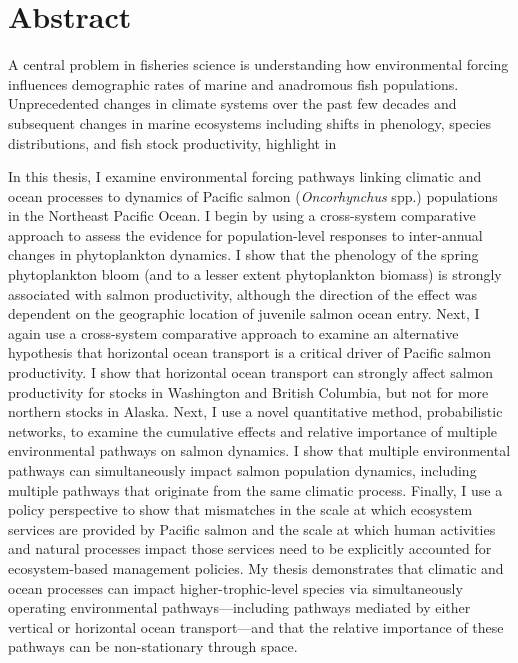 %
%
%


\chapter*{Abstract}


A central problem in fisheries science is understanding how environmental
forcing influences demographic rates of marine and anadromous fish populations.
Unprecedented changes in climate systems over the past few decades and
subsequent changes in marine ecosystems including shifts in phenology, species
distributions, and fish stock productivity, highlight in


In this thesis, I examine environmental forcing pathways linking climatic and
ocean processes to dynamics of Pacific salmon (\textit{Oncorhynchus} spp.)
populations in the Northeast Pacific Ocean. I begin by using a cross-system
comparative approach to assess the evidence for population-level responses to
inter-annual changes in phytoplankton dynamics. I show that the phenology of the
spring phytoplankton bloom (and to a lesser extent phytoplankton biomass) is
strongly associated with salmon productivity, although the direction of the
effect was dependent on the geographic location of juvenile salmon ocean entry.
Next, I again use a cross-system comparative approach to examine an alternative
hypothesis that horizontal ocean transport is a critical driver of Pacific
salmon productivity. I show that horizontal ocean transport can strongly affect
salmon productivity for stocks in Washington and British Columbia, but not for
more northern stocks in Alaska. Next, I use a novel quantitative method,
probabilistic networks, to examine the cumulative effects and relative
importance of multiple environmental pathways on salmon dynamics. I show that
multiple environmental pathways can simultaneously impact salmon population
dynamics, including multiple pathways that originate from the same climatic
process. Finally, I use a policy perspective to show that mismatches in the
scale at which ecosystem services are provided by Pacific salmon and the scale
at which human activities and natural processes impact those services need to be
explicitly accounted for ecosystem-based management policies. My thesis
demonstrates that climatic and ocean processes can impact higher-trophic-level
species via simultaneously operating environmental pathways---including pathways
mediated by either vertical or horizontal ocean transport---and that the
relative importance of these pathways can be non-stationary through space.
